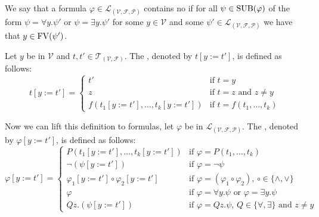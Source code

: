 \begin{definition}\label{def.2.19}
We say that a formula $\varphi\in\mathcal{L}_{(\mathcal{V},\mathcal{F},\mathcal{P})}$ contains no  if for all $\psi\in\text{SUB}(\varphi)$ of the form $\psi=\forall y.\psi'$ or $\psi=\exists y.\psi'$ for some $y\in\mathcal{V}$ and some $\psi'\in\mathcal{L}_{(\mathcal{V},\mathcal{F},\mathcal{P})}$ we have that $y\in\text{FV}(\psi')$.
\end{definition}

\begin{definition}\label{def.2.20}
	Let $y$ be in $\mathcal{V}$ and $t,t'\in\mathcal{T}_{(\mathcal{V},\mathcal{F})}$. The , denoted by $t\left[y:=t'\right]$, is defined as follows:
	\[t\left[y:=t'\right]=
		\begin{cases}
			t'                                                   & \text{if $t=y$}                \\ 
			z                                                    & \text{if $t=z$ and $z\neq y$}  \\%
			f(t_1\left[y:=t'\right],\dots,t_k\left[y:=t'\right]) & \text{if $t=f(t_1,\dots,t_k)$} 
		\end{cases}\]
	
	Now we can lift this definition to formulas, let $\varphi$ be in $\mathcal{L}_{(\mathcal{V},\mathcal{F},\mathcal{P})}$. The , denoted by $\varphi\left[y:=t'\right]$, is defined as follows:
	\[\varphi\left[y:=t'\right]=
		\begin{cases}
			P(t_1\left[y:=t'\right],\dots,t_k\left[y:=t'\right])        & \text{if $\varphi=P(t_1,\dots,t_k)$}                                     \\
			\neg(\psi\left[y:=t'\right])                                      & \text{if $\varphi=\neg\psi$}                                             \\ %
			\varphi_1\left[y:=t'\right]\circ\varphi_2\left[y:=t'\right] & \text{if $\varphi=(\varphi_1\circ\varphi_2)$, $\circ\in\{\wedge,\vee\}$} \\
			\varphi                                                     & \text{if $\varphi=\forall y.\psi$ or $\varphi=\exists y.\psi$}                   \\
			Q z.(\psi\left[y:=t'\right])                                 & \text{if $\varphi=Q z.\psi$, $Q\in\{\forall,\exists\}$ and $z\neq y$}     
		\end{cases}\]

\end{definition}

